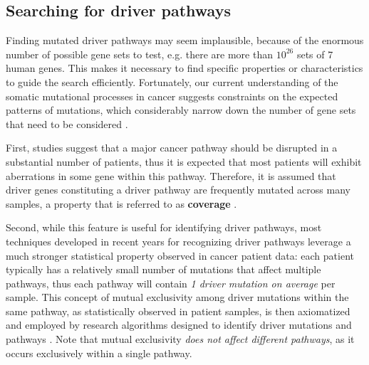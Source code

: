 %

\subsection{Searching for driver pathways}

Finding mutated driver pathways may seem implausible, because of the enormous number of possible gene sets to test, e.g. there are more than $10^{26}$ sets of 7 human genes. This makes it necessary to find specific properties or characteristics to guide the search efficiently. Fortunately, our current understanding of the somatic mutational processes in cancer suggests constraints on the expected patterns of mutations, which considerably narrow down the number of gene sets that need to be considered \cite{dendrix}.

First, studies suggest that a major cancer pathway should be disrupted in a substantial number of patients, thus it is expected that most patients will exhibit aberrations in some gene within this pathway. Therefore, it is assumed that driver genes constituting a driver pathway are frequently mutated across many samples, a property that is referred to as \textbf{coverage} \cite{dendrix}.

Second, while this feature is useful for identifying driver pathways, most techniques developed in recent years for recognizing driver pathways leverage a much stronger statistical property observed in cancer patient data: each patient typically has a relatively small number of mutations that affect multiple pathways, thus each pathway will contain \textit{1 driver mutation on average} per sample. This concept of mutual exclusivity among driver mutations within the same pathway, as statistically observed in patient samples, is then axiomatized and employed by research algorithms designed to identify driver mutations and pathways \cite{multi-dendrix}. Note that mutual exclusivity \textit{does not affect different pathways}, as it occurs exclusively within a single pathway.


